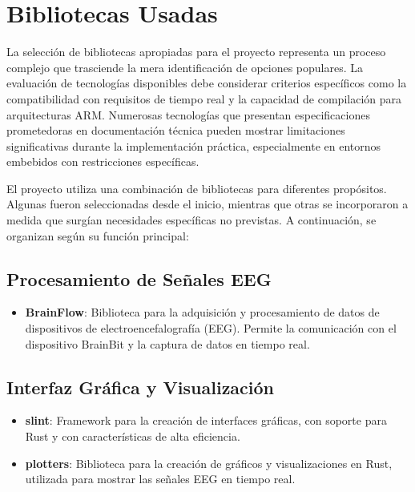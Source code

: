 \newpage

\section{Bibliotecas Usadas}

La selección de bibliotecas apropiadas para el proyecto representa un proceso complejo que trasciende la mera identificación de opciones populares. La evaluación de tecnologías disponibles debe considerar criterios específicos como la compatibilidad con requisitos de tiempo real y la capacidad de compilación para arquitecturas ARM. Numerosas tecnologías que presentan especificaciones prometedoras en documentación técnica pueden mostrar limitaciones significativas durante la implementación práctica, especialmente en entornos embebidos con restricciones específicas.

El proyecto utiliza una combinación de bibliotecas para diferentes propósitos. Algunas fueron seleccionadas desde el inicio, mientras que otras se incorporaron a medida que surgían necesidades específicas no previstas. A continuación, se organizan según su función principal:

\subsection{Procesamiento de Señales EEG}
\begin{itemize}
    \item \textbf{BrainFlow}: Biblioteca para la adquisición y procesamiento de datos de dispositivos de electroencefalografía (EEG). Permite la comunicación con el dispositivo BrainBit y la captura de datos en tiempo real.
\end{itemize}

\subsection{Interfaz Gráfica y Visualización}
\begin{itemize}
    \item \textbf{slint}: Framework para la creación de interfaces gráficas, con soporte para Rust y con características de alta eficiencia.
    \item \textbf{plotters}: Biblioteca para la creación de gráficos y visualizaciones en Rust, utilizada para mostrar las señales EEG en tiempo real.
\end{itemize}

